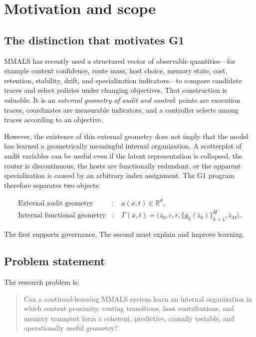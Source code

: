 \documentclass[11pt,a4paper]{article}
\newcommand{\R}{\mathbb{R}}
\begin{document}
\tableofcontents
\newpage

\section{Motivation and scope}

\subsection{The distinction that motivates G1}

MMALS has recently used a structured vector of observable quantities---for example context confidence, route mass, host choice, memory state, cost, retention, stability, drift, and specialization indicators---to compare candidate traces and select policies under changing objectives. That construction is valuable. It is an \emph{external geometry of audit and control}: points are execution traces, coordinates are measurable indicators, and a controller selects among traces according to an objective.

However, the existence of this external geometry does not imply that the model has learned a geometrically meaningful internal organization. A scatterplot of audit variables can be useful even if the latent representation is collapsed, the router is discontinuous, the hosts are functionally redundant, or the apparent specialization is caused by an arbitrary index assignment. The G1 program therefore separates two objects:

\begin{align}
\text{External audit geometry} &: \quad a(x,t) \in \R^d,\\
\text{Internal functional geometry} &: \quad \Gamma(x,t)=\bigl(z_0,c,r,\{g_h(z_0)\}_{h=1}^H,z_M\bigr).
\end{align}

The first supports governance. The second must explain and improve learning.

\subsection{Problem statement}

The research problem is:

\begin{quote}
Can a continual-learning MMALS system learn an internal organization in which context proximity, routing transitions, host contributions, and memory transport form a coherent, predictive, causally testable, and operationally useful geometry?
\end{quote}
\end{document}
